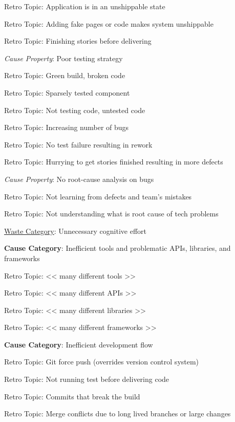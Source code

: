 \quad \quad \quad Retro Topic: Application is in an unshippable state

\quad \quad \quad Retro Topic: Adding fake pages or code makes system unshippable

\quad \quad \quad Retro Topic: Finishing stories before delivering

\quad \quad \textit{Cause Property}: Poor testing strategy

\quad \quad \quad Retro Topic: Green build, broken code

\quad \quad \quad Retro Topic: Sparsely tested component

\quad \quad \quad Retro Topic: Not testing code, untested code

\quad \quad \quad Retro Topic: Increasing number of bugs

\quad \quad \quad Retro Topic: No test failure resulting in rework

\quad \quad \quad Retro Topic: Hurrying to get stories finished resulting in more defects

\quad \quad \textit{Cause Property}: No root-cause analysis on bugs

\quad \quad \quad Retro Topic: Not learning from defects and team's mistakes

\quad \quad \quad Retro Topic: Not understanding what is root cause of tech problems




\underline{Waste Category}: Unnecessary cognitive effort

\quad \textbf{Cause Category}: Inefficient tools and problematic APIs, libraries, and frameworks

\quad \quad Retro Topic: << many different tools >>

\quad \quad Retro Topic: << many different APIs >>

\quad \quad Retro Topic: << many different libraries >>

\quad \quad Retro Topic: << many different frameworks >>

\quad \textbf{Cause Category}: Inefficient development flow

\quad \quad Retro Topic: Git force push (overrides version control system)

\quad \quad Retro Topic: Not running test before delivering code

\quad \quad Retro Topic: Commits that break the build

\quad \quad Retro Topic: Merge conflicts due to long lived branches or large changes

